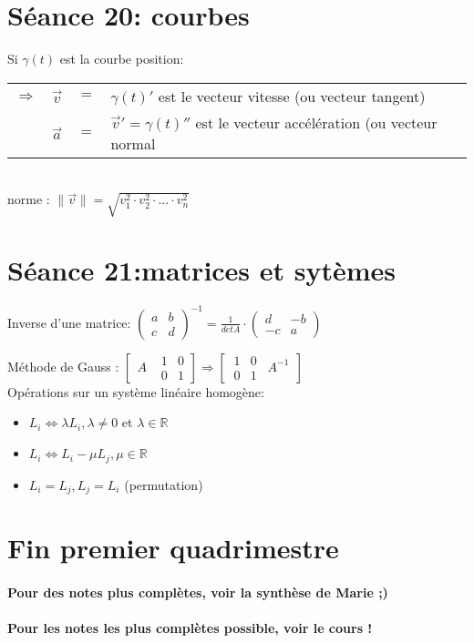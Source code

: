 \documentclass[12pt]{article}
\begin{document}
\section*{S\'eance 20: courbes}

Si $\gamma(t)$ est la courbe position: \\
\begin{tabular}{r c c l }
	\(\Rightarrow\) & \(\vec{v}\) & \( = \) & \(\gamma(t)'\) est le vecteur vitesse (ou vecteur tangent)\\
	& \(\vec{a}\) & \( = \) & \(\vec{v}' = \gamma(t)''\) est le vecteur acc\'el\'eration (ou vecteur normal
\end{tabular} \\ \newline
norme : \(\|\vec{v}\| = \sqrt{v_{1}^{2} \cdot v_{2}^{2} \cdot ... \cdot v_{n}^{2} }\)

\section*{ S\'eance 21:matrices et syt\`emes}

 Inverse d'une matrice: $\begin{pmatrix}
a & b \\
c & d
\end{pmatrix}^{-1} = \frac{1}{det A} \cdot \begin{pmatrix} d & -b \\ -c & a \end{pmatrix}$

M\'ethode de Gauss : 
\(\left\lbrack\ \  A^{}\ \ \  
 \begin{array}{|cc}
  1&0\\
  0&1
 \end{array}\right\rbrack
\Rightarrow  \left\lbrack\
\begin{array}{cc|}
  1&0\\
  0&1
\end{array}\ \  A^{-1} \ \ \right\rbrack\) \\
\newline
Op\'erations sur un syst\`eme lin\'eaire homog\`ene:
\begin{itemize}
\item $L_{i} \Leftrightarrow \lambda L_{i}, \lambda \not= 0$ et $\lambda \in \mathbb{R}$
\item $L_{i} \Leftrightarrow L_{i} - \mu L_{j}, \mu \in \mathbb{R}$ 
\item $L_{i}= L_{j}, L_{j} = L_{i}$ (permutation)
\end{itemize}
\section*{Fin premier quadrimestre}
\paragraph{Pour des notes plus compl\`etes, voir la synth\`ese de Marie ;)}
\paragraph{Pour les notes les plus compl\`etes possible, voir le cours !}
\end{document}
